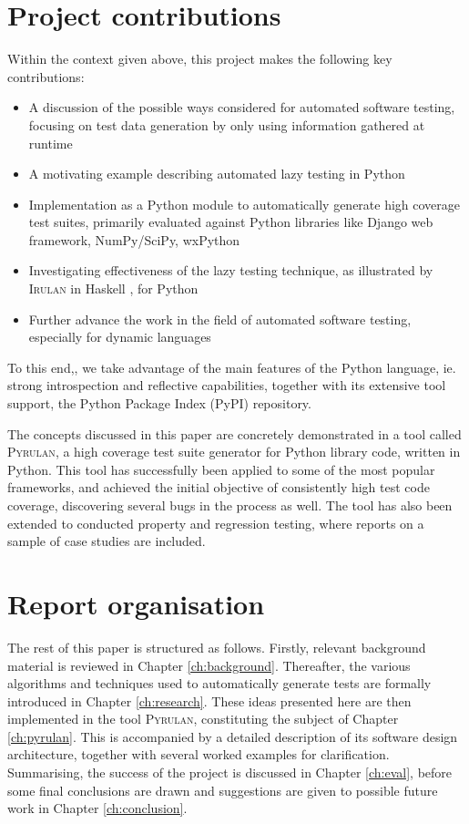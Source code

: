 \documentclass{icldt}
\numberwithin{equation}{section}       %
\begin{document}
\section{Project contributions}
Within the context given above, this project makes the following key contributions:

\begin{itemize}
	\item A discussion of the possible ways considered for automated software testing, focusing on test data generation by only using information gathered at runtime
	\item A motivating example describing automated lazy testing in Python
	\item Implementation as a Python module to automatically generate high coverage test suites, primarily evaluated against Python libraries like Django web framework, NumPy/SciPy, wxPython
	\item Investigating effectiveness of the lazy testing technique, as illustrated by \textsc{Irulan} in Haskell \cite{Allwood2011}, for Python
	\item Further advance the work in the field of automated software testing, especially for dynamic languages
\end{itemize}

To this end,, we take advantage of the main features of the Python language, ie. strong introspection and reflective capabilities, together with its extensive tool support, the Python Package Index (PyPI) repository.

The concepts discussed in this paper are concretely demonstrated in a tool called \textsc{Pyrulan}, a high coverage test suite generator for Python library code, written in Python. This tool has successfully been applied to some of the most popular frameworks, and achieved the initial objective of consistently high test code coverage, discovering several bugs in the process as well. The tool has also been extended to conducted property and regression testing, where reports on a sample of case studies are included.

\section{Report organisation}
The rest of this paper is structured as follows. Firstly, relevant background material is reviewed in Chapter \ref{ch:background}. Thereafter, the various algorithms and techniques used to automatically generate tests are formally introduced in Chapter \ref{ch:research}. These ideas presented here are then implemented in the tool \textsc{Pyrulan}, constituting the subject of Chapter \ref{ch:pyrulan}. This is accompanied by a detailed description of its software design architecture, together with several worked examples for clarification. Summarising, the success of the project is discussed in Chapter \ref{ch:eval}, before some final conclusions are drawn and suggestions are given to possible future work in Chapter \ref{ch:conclusion}.
\end{document}
